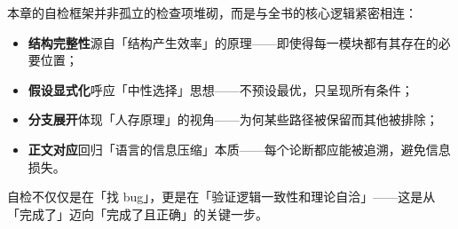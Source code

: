 \documentclass[../main.tex]{subfiles}
\begin{document}
本章的自检框架并非孤立的检查项堆砌，而是与全书的核心逻辑紧密相连：
\begin{itemize}
	\item \textbf{结构完整性}源自「结构产生效率」的原理——即使得每一模块都有其存在的必要位置；
	\item \textbf{假设显式化}呼应「中性选择」思想——不预设最优，只呈现所有条件；
	\item \textbf{分支展开}体现「人存原理」的视角——为何某些路径被保留而其他被排除；
	\item \textbf{正文对应}回归「语言的信息压缩」本质——每个论断都应能被追溯，避免信息损失。
\end{itemize}
自检不仅仅是在「找 bug」，更是在「验证逻辑一致性和理论自洽」——这是从「完成了」迈向「完成了且正确」的关键一步。
\end{document}
